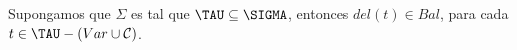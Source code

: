   \begin{lemma}
    \PN Supongamos que $\Sigma$ es tal que $\TAU \subseteq \SIGMA$, entonces $del(t) \in Bal$, para cada $t \in \TAU -
    (Var \cup \mathcal{C})$.
  \end{lemma}
